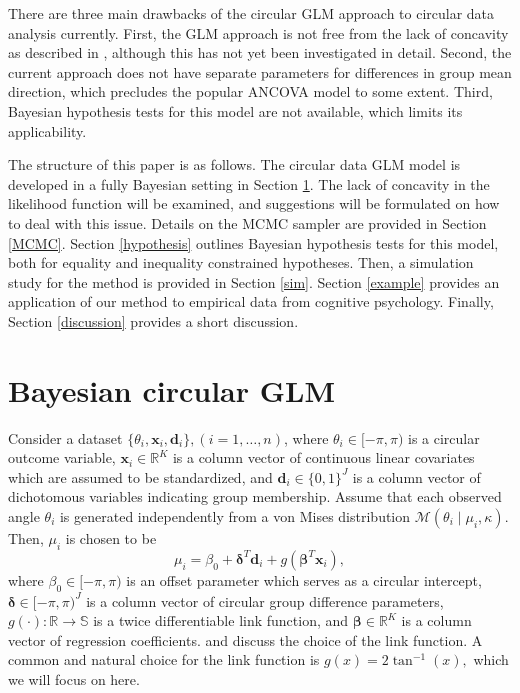 \documentclass[11pt,a4paper]{article}\usepackage[]{graphicx}\usepackage[]{color}
\newcommand{\bx}{\boldsymbol{x}}
\newcommand{\bd}{\boldsymbol{d}}
\newcommand{\bdt}{\boldsymbol{\delta}}
\newcommand{\bbt}{\boldsymbol{\beta}}
\begin{document}
There are three main drawbacks of the circular GLM approach  to circular data analysis currently. First, the GLM approach is not free from the lack of concavity as described in \citet{gill2010}, although this has not yet been investigated in detail. Second, the current approach does not have separate parameters for differences in group mean direction, which precludes the popular ANCOVA model to some extent. Third, Bayesian hypothesis tests for this model are not available, which limits its applicability.

The structure of this paper is as follows. The circular data GLM model is developed in a fully Bayesian setting in Section \ref{themodel}. The lack of concavity in the likelihood function will be examined, and suggestions will be formulated on how to deal with this issue. Details on the MCMC sampler are provided in Section \ref{MCMC}. Section \ref{hypothesis} outlines Bayesian hypothesis tests for this model, both for equality and inequality constrained hypotheses. Then, a simulation study for the method is provided in Section \ref{sim}. Section \ref{example} provides an application of our method to empirical data from cognitive psychology. Finally, Section \ref{discussion} provides a short discussion.




\section{Bayesian circular GLM}

\label{themodel}

Consider a dataset \( \{ \theta_i, \bx_i, \bd_i \}, (i = 1, \dots, n) \), where \( \theta_i \in [-\pi, \pi) \) is a circular outcome variable, \( \bx_i \in \mathbb{R}^K \) is a column vector of continuous linear covariates which are assumed to be standardized, and \( \bd_i \in \{0, 1\}^J \) is a column vector of dichotomous variables indicating group membership. Assume that each observed angle $\theta_i$ is generated independently from a von Mises distribution \( \mathcal{M}(\theta_i \mid \mu_i, \kappa) \). Then, \( \mu_i \) is chosen to be
\begin{equation}
\mu_i = \beta_0 + \bdt^T \bd_i + g(\bbt^T \bx_i),
\end{equation}
where \( \beta_0 \in [-\pi, \pi) \) is an offset parameter which serves as a circular intercept, \( \bdt \in [-\pi, \pi)^J \) is a column vector of circular group difference parameters, \( g(\cdot) : \mathbb{R} \rightarrow \mathbb{S} \) is a twice differentiable link function, and \(\bbt \in \mathbb{R}^K \) is a column vector of regression coefficients. \citet{jammalamadaka2001topics} and \citet{fisher1992regression} discuss the choice of the link function. A common and natural choice for the link function is \( g(x) = 2 \tan^{-1}(x),\) which we will focus on here.
\end{document}

